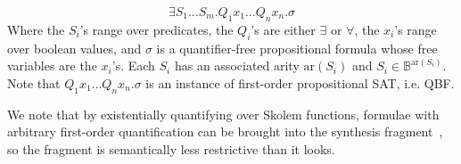 \documentclass[a4paper]{llncs}
\begin{document}
\begin{definition}
\label{def:2sat}
 \[
  \exists S_1 \ldots S_m . Q_1 x_1 \ldots Q_n x_n . \sigma
 \]
 Where the $S_i$'s range over predicates,
the $Q_i$'s are either $\exists$ or $\forall$,
the $x_i$'s range over boolean values,
 and $\sigma$ is a quantifier-free propositional formula
 whose free variables are the $x_i$'s.  
Each $S_i$ has an associated arity $\mathrm{ar}(S_i)$
 and $S_i \in \mathbb{B}^{\mathrm{ar}(S_i)}$.  Note that 
$Q_1 x_1 \ldots Q_n x_n . \sigma$
 is an instance of first-order propositional SAT, i.e. QBF.
\end{definition}





%
We note that by existentially quantifying over Skolem functions, formulae with arbitrary
first-order quantification can be brought into the synthesis fragment~\cite{hol-book}, so the
fragment is semantically less restrictive than it looks.
\end{document}
